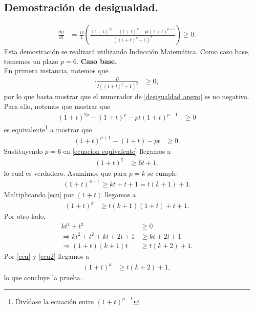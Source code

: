 \subsection{Demostración de desigualdad.}\label{demostracion derivada}
\begin{align}\label{desigualdad anexo}
    \frac{d\mu}{dt} &= \frac{D}{I}\left( \frac{(1+t)^{2p} - (1+t)^p-pt(1+t)^{p-1}}{((1+t)^p-1)^2} \right) \geq 0.
\end{align}
Esta demostración se realizará utilizando Inducción Matemática. Como caso base, tomemos un plazo $p=6$. 
\newpage
\textbf{Caso base. } \\ 
En primera instancia, notemos que 
\begin{align*}
    \cdot \frac{D}{I((1+t)^p-1)^2} &\geq 0,
\end{align*}
por lo que basta mostrar que el numerador de \ref{desigualdad anexo} es no negativo. Para ello, notemos que mostrar que
\begin{align*}
    (1+t)^{2p} - (1+t)^p-pt(1+t)^{p-1} &\geq 0
\end{align*}
es equivalente\footnote{Divídase la ecuación entre $(1+t)^{p-1}$} a mostrar que
\begin{align}\label{ecuacion equivalente}
    (1+t)^{p+1} - (1+t) -pt &\geq 0.
\end{align}
Sustituyendo $p=6$ en \ref{ecuacion equivalente} llegamos a 
\begin{align*}
    (1+t)^5 &\geq 6t+1,
\end{align*}
lo cual es verdadero. Asumimos que para $p= k$ se cumple
\begin{align}\label{ecu}
    (1+t)^{k-1} \geq kt +t +1 = t(k+1) + 1.
\end{align}
Multiplicando \ref{ecu} por $(1+t)$ llegamos a 
\begin{align}\label{ecu2}
    (1+t)^k &\geq t(k+1)(1+t) + t + 1.
\end{align}
Por otro lado,  
\begin{align*}\label{ecu2}
    kt^2+t^2 &\geq 0 \\
    \Rightarrow kt^2+t^2+kt+2t+1 &\geq kt+2t+1 \\ 
    \Rightarrow (1+t)(k+1)t &\geq t(k+2)+1.
\end{align*}
Por \ref{ecu} y \ref{ecu2} llegamos a 
\begin{align*}
    (1+t)^k &\geq t(k+2)+1,
\end{align*}
lo que concluye la prueba. \\


